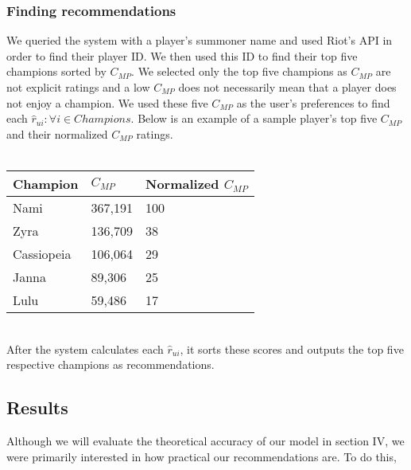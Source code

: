 \documentclass [11pt]{IEEEtran}
\begin{document}
\subsubsection{Finding recommendations}
We queried the system with a player's summoner name and used Riot's API in order to find their player ID. We then used this ID to find their top five champions sorted by $C_{MP}$. We selected only the top five champions as $C_{MP}$ are not explicit ratings and a low $C_{MP}$ does not necessarily mean that a player does not enjoy a champion. We used these five $C_{MP}$ as the user's preferences to find each $\hat{r}_{ui} : \forall i \in Champions$. Below is an example of a sample player's top five $C_{MP}$ and their normalized $C_{MP}$ ratings. \\\\
\begin{tabular}{| l | l | l |}
    \hline
    Champion & $C_{MP}$ & Normalized $C_{MP}$ \\ \hline
    Nami & 367,191 & 100\\ 
    Zyra & 136,709 & 38 \\
    Cassiopeia & 106,064 & 29 \\
    Janna & 89,306 & 25\\
    Lulu & 59,486 & 17\\
    \hline
\end{tabular}
\vspace{.2cm} \\ \noindent
After the system calculates each $\hat{r}_{ui}$, it sorts these scores and outputs the top five respective champions as recommendations. 

\subsection{Results}
Although we will evaluate the theoretical accuracy of our model in section IV, we were primarily interested in how practical our recommendations are. To do this,
\end{document}
